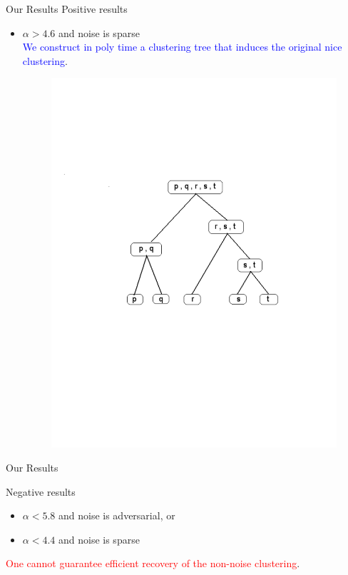\documentclass{beamer}
\begin{document}
\begin{frame}{Our Results}
 \alert{Positive results}
 
 \begin{itemize}
  	\item $\alpha > 4.6$ and noise is sparse\\ 
	
	
	\textcolor{blue}{We construct  in poly time a clustering tree that induces the original nice clustering}.
  	
	\begin{figure}
	  \includegraphics[trim = 50 150 50 200, clip, width=0.8\linewidth]{hier.pdf}
	\end{figure}
	  	
  \end{itemize}
  
\end{frame}
\begin{frame}{Our Results}
  
\alert{Negative results}
  \begin{itemize}
  	\item $\alpha < 5.8$ and noise is adversarial, or 
	\item $\alpha < 4.4$ and noise is sparse
	
\end{itemize}

	 \textcolor{red}{One cannot guarantee efficient recovery of the non-noise clustering}. 
\end{frame}
\end{document}
